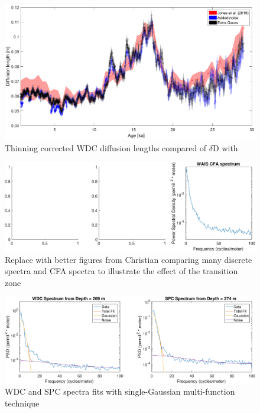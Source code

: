\documentclass[draft, jgrga]{AGUTeX}
\begin{document}
\begin{figure}
	\includegraphics[width=.9\linewidth]{WAIS_diffusion_lengths_thinning_corr.eps}
	\caption{Thinning corrected WDC diffusion lengths compared of $\delta$D with \cite{Jones2016}} \label{WAIS_diffusion_lengths_thinning_corr}
\end{figure}



\begin{figure}
\includegraphics[width=.9\linewidth]{spectra_disVScfa.eps}
\caption{Replace with better figures from Christian comparing many discrete spectra and CFA spectra to illustrate the effect of the transition zone}\label{spectra_disVScfa}
\end{figure}
%

\begin{figure}
\includegraphics[width=.9\linewidth]{1_gauss.eps}
\caption{WDC and SPC spectra fits with single-Gaussian multi-function technique}\label{1_gauss}
\end{figure}
\end{document}
